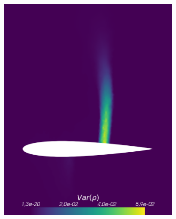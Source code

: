 \begin{figure}[h!]
\begin{subfigure}{0.3\linewidth}
		\includegraphics[scale=0.2]{figs/Euler1DPlots10/euler2D_nacaCoarse_refadosipm_n2-9_sg2-4_s05_aoa_oneRet_VarRho.png}
		\label{fig:sub2}
	\end{subfigure}%
	\hfill
	\begin{subfigure}{0.3\linewidth}
		\centering

\end{subfigure}
\end{figure}
